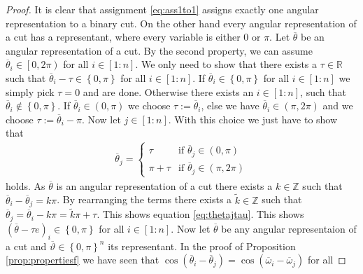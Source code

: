 \documentclass[12pt,a4paper]{article}
\theoremstyle{mythm}
\begin{document}
\begin{proof}
It is clear that assignment \ref{eq:ass1to1} assigns exactly one angular representation to a binary cut.
On the other hand every angular representation of a cut has a representant, where every variable is either $ 0 $ or $ \pi $.
Let $ \overline{ \theta}   $ be an angular representation of a cut. 
By the second property, we can assume $ \overline{ \theta}_i  \in \left[ 0, 2 \pi \right)  $ for all $ i \in \left[ 1:n \right]  $.
We only need to show that there exists a $ \tau \in \mathbb{R} $ such that $ \overline{ \theta }_i - \tau \in \left\{ 0, \pi  \right\}	$ for all $ i \in \left[ 1:n \right] $.
If $ \overline{ \theta } _{ i } \in \left\{ 0, \pi  \right\}  $ for all $ i \in \left[ 1:n \right]  $ we simply pick $ \tau = 0 $ and are done.
Otherwise there exists an $ i \in \left[ 1:n \right]  $, such that $ \overline{ \theta  }_i \notin \left\{ 0, \pi  \right\}  $. 
If $ \overline{ \theta }_i \in \left( 0 , \pi  \right)  $ we choose $ \tau := \overline{ \theta }_i  $, else we have $ \overline{ \theta } _{ i } \in \left( \pi , 2 \pi
\right)  $ and we choose $ \tau := \overline{ \theta } _{ i } - \pi $.
Now let $ j \in \left[ 1:n \right]  $. 
With this choice we just have to show that 
\begin{align}
\label{eq:thetajtau} 
 \overline{ \theta } _{ j } = \begin{cases}
 \tau  & \text{if } \overline{ \theta } _{ j } \in \left( 0, \pi \right) \\
 \pi + \tau  & \text{if } \overline{ \theta } _{ j } \in \left( \pi, 2 \pi \right) 
 \end{cases}
\end{align} 
holds.
As $ \overline{ \theta }  $ is an angular representation of a cut there exists a $ k \in \mathbb{Z} $ such that 
$ \overline{ \theta } _{ i } - \overline{ \theta } _{ j } = k \pi   $. By rearranging the terms there exists a $ \widetilde{ k } \in \mathbb{Z} $ such that  
$ \overline{ \theta } _{ j } = \overline{ \theta } _{ i } - k \pi = \widetilde{ k } \pi + \tau $.
This shows equation \ref{eq:thetajtau}. 
This shows $ \left( \overline{ \theta } - \tau e  \right) _{ i } \in \left\{ 0, \pi  \right\}  $ for all $ i \in \left[ 1:n \right]  $.
Now let $ \overline{ \theta }  $ be any angular representaion of a cut and $ \overline{ \vartheta } \in \left\{ 0, \pi  \right\} ^{ n }   $ its representant.
In the proof of Proposition \ref{prop:propertiesf} we have seen that $ \cos( \overline{ \theta} _{ i } - \overline{ \theta }  _{ j }    )  = \cos( \overline{ \omega } _{ i } -
\overline{ \omega } _{ j }  ) $ for all 
\end{proof}
\end{document}
